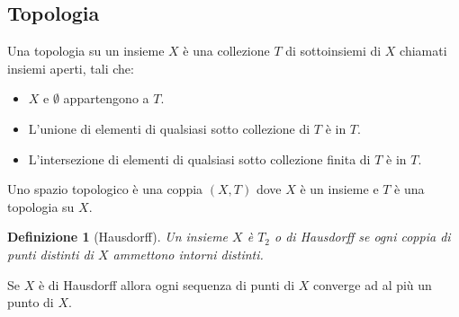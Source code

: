 \documentclass[a4paper, 12pt]{article}
\newtheorem{definition}{Definizione}
\begin{document}
\subsection{Topologia}
Una topologia su un insieme $X$ è una collezione $T$ di sottoinsiemi di $X$ chiamati insiemi aperti, tali che:
\begin{itemize}
    \item $X$ e $\emptyset$ appartengono a $T$.
    \item L'unione di elementi di qualsiasi sotto collezione di $T$ è in $T$.
    \item L'intersezione di elementi di qualsiasi sotto collezione finita di $T$ è in $T$.
\end{itemize}
Uno spazio topologico è una coppia $(X,T)$ dove $X$ è un insieme e $T$ è una topologia su $X$.
\begin{definition}[Hausdorff]
Un insieme $X$ è $T_2$ o di Hausdorff se ogni coppia di punti distinti di $X$ ammettono intorni distinti.
\end{definition}
Se $X$ è di Hausdorff allora ogni sequenza di punti di $X$ converge ad al più un punto di $X$.
\end{document}

